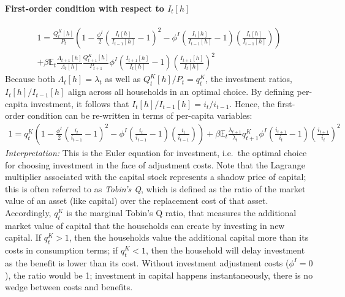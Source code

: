 \begin{enumerate}
\paragraph{First-order condition with respect to \(I_{t}[h]\)}
\begin{multline*}
1 = \frac{Q^{K}_{t}[h]}{P_{t}} \left( 1 - \frac{\phi^{I}}{2} {\left(\frac{I_{t}[h]}{I_{t-1}[h]}-1\right)}^2 - \phi^{I} \left(\frac{I_{t}[h]}{I_{t-1}[h]}-1\right) \left(\frac{I_{t}[h]}{I_{t-1}[h]}\right) \right)
\\
+ \beta \mathbb{E}_{t} \frac{\Lambda_{t+1}[h]}{\Lambda_{t}[h]} \frac{Q^{K}_{t+1}[h]}{P_{t+1}} \phi^{I} \left(\frac{I_{t+1}[h]}{I_{t}[h]}-1\right) {\left(\frac{I_{t+1}[h]}{I_{t}[h]}\right)}^2
\end{multline*}
Because both \(\Lambda_{t}[h]=\lambda_{t}\) as well as \(Q^{K}_{t}[h]/P_{t} = q^{K}_{t}\),
  the investment ratios, \(I_{t}[h]/I_{t-1}[h]\) align across all households in an optimal choice.
By defining per-capita investment, it follows that \(I_{t}[h]/I_{t-1}[h] = i_{t}/i_{t-1}\).
Hence, the first-order condition can be re-written in terms of per-capita variables:
\begin{align*}
1 = q^{K}_{t} \left( 1 - \frac{\phi^{I}}{2} {\left(\frac{i_{t}}{i_{t-1}}-1\right)}^2 - \phi^{I} \left(\frac{i_{t}}{i_{t-1}}-1\right) \left(\frac{i_{t}}{i_{t-1}}\right) \right)
+ \beta \mathbb{E}_{t} \frac{\lambda_{t+1}}{\lambda_{t}} q^{K}_{t+1} \phi^{I} \left(\frac{i_{t+1}}{i_{t}}-1\right) {\left(\frac{i_{t+1}}{i_{t}}\right)}^2
\end{align*}
\emph{Interpretation:}
This is the Euler equation for investment,
  i.e.\ the optimal choice for choosing investment in the face of adjustment costs.
Note that the Lagrange multiplier associated with the capital stock represents a shadow price of capital;
  this is often referred to as \emph{Tobin's Q},
  which is defined as the ratio of the market value of an asset (like capital) over the replacement cost of that asset.
Accordingly, \(q^{K}_t\) is the marginal Tobin's Q ratio,
  that measures the additional market value of capital that the households can create by investing in new capital.
If \(q^{K}_{t}>1\), then the households value the additional capital more than its costs in consumption terms;
  if \(q^{K}_{t}<1\), then the household will delay investment as the benefit is lower than its cost.
Without investment adjustment costs (\(\phi^{I}=0\)), the ratio would be 1;
  investment in capital happens instantaneously, there is no wedge between costs and benefits.


\end{enumerate}
